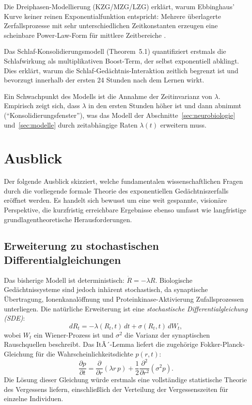 ﻿\documentclass[12pt,a4paper,twoside]{article}
\theoremstyle{theormstyle}
\theoremstyle{proofstyle}
\begin{document}
	Die Dreiphasen-Modellierung (KZG/MZG/LZG) erklärt, warum Ebbinghaus'
	Kurve keiner reinen Exponentialfunktion entspricht: Mehrere überlagerte
	Zerfallsprozesse mit sehr unterschiedlichen Zeitkonstanten erzeugen
	eine scheinbare Power-Law-Form für mittlere Zeitbereiche \citep{wixted2004psychology}.
	
	Das Schlaf-Konsolidierungsmodell (Theorem~5.1) quantifiziert erstmals
	die Schlafwirkung als multiplikativen Boost-Term,
	der selbst exponentiell abklingt. Dies erklärt, warum die
	Schlaf-Gedächtnis-Interaktion zeitlich begrenzt ist und bevorzugt
	innerhalb der ersten 24 Stunden nach dem Lernen wirkt.
	
	Ein Schwachpunkt des Modells ist die Annahme der Zeitinvarianz von $\lambda$.
	Empirisch zeigt sich, dass $\lambda$ in den ersten Stunden höher ist
	und dann abnimmt (``Konsolidierungsfenster''), was das Modell
	der Abschnitte~\ref{sec:neurobiologie} und~\ref{sec:modelle} durch
	zeitabhängige Raten $\lambda(t)$ erweitern muss.
	
	\section{Ausblick}
	\label{sec:ausblick}
	
	Der folgende Ausblick skizziert, welche fundamentalen wissenschaftlichen
	Fragen durch die vorliegende formale Theorie des exponentiellen Gedächtniszerfalls
	eröffnet werden. Es handelt sich bewusst um eine weit gespannte, visionäre
	Perspektive, die kurzfristig erreichbare Ergebnisse ebenso umfasst wie
	langfristige grundlagentheoretische Herausforderungen.
	
	\subsection{Erweiterung zu stochastischen Differentialgleichungen}
	
	Das bisherige Modell ist deterministisch: $\dot{R} = -\lambda R$.
	Biologische Gedächtnissysteme sind jedoch inhärent stochastisch,
	da synaptische Übertragung, Ionenkanalöffnung und Proteinkinase-Aktivierung
	Zufallsprozessen unterliegen. Die natürliche Erweiterung ist eine
	\emph{stochastische Differentialgleichung (SDE)}:
	\[
	dR_t = -\lambda(R_t, t)\,dt + \sigma(R_t, t)\,dW_t,
	\]
	wobei $W_t$ ein Wiener-Prozess ist und $\sigma^2$ die Varianz der
	synaptischen Rauschquellen beschreibt. Das ItÃ´-Lemma liefert die
	zugehörige Fokker-Planck-Gleichung für die Wahrscheinlichkeitsdichte
	$p(r, t)$:
	\[
	\frac{\partial p}{\partial t}
	= \frac{\partial}{\partial r}(\lambda r\,p)
	+ \frac{1}{2}\frac{\partial^2}{\partial r^2}(\sigma^2 p).
	\]
	Die Lösung dieser Gleichung würde erstmals eine vollständige statistische
	Theorie des Vergessens liefern, einschließlich der Verteilung der
	Vergessenszeiten für einzelne Individuen.
	
\end{document}
